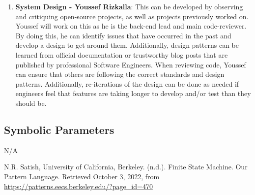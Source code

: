 \documentclass[12pt, titlepage]{article}
\begin{document}
\begin{enumerate}
\item\textbf{System Design - Youssef Rizkalla}: This can be developed by observing and critiquing open-source projects, as well as projects previously worked on. Youssef will work on this as he is the back-end lead and main code-reviewer. By doing this, he can identify issues that have occurred in the past and develop a design to get around them. Additionally, design patterns can be learned from official documentation or trustworthy blog posts that are published by professional Software Engineers. When reviewing code, Youssef can ensure that others are following the correct standards and design patterns. Additionally, re-iterations of the design can be done as needed if engineers feel that features are taking longer to develop and/or test than they should be.

\end{enumerate}

\subsection{Symbolic Parameters}
N/A


\begin{thebibliography}{9}
N.R. Satish, University of California, Berkeley. (n.d.). Finite State Machine. Our Pattern Language. Retrieved October 3, 2022, from \href{https://patterns.eecs.berkeley.edu/?page_id=470}{https://patterns.eecs.berkeley.edu/?page\_id=470} 
\end{thebibliography}
\end{document}
